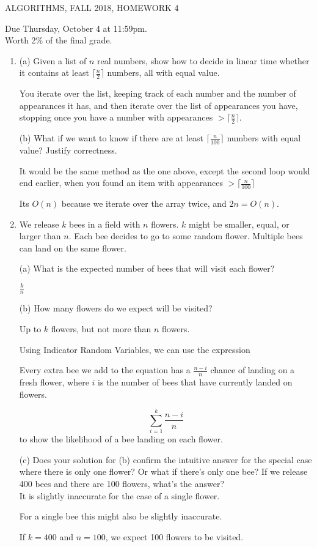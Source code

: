 \documentclass[12pt]{article}
\begin{document}
  
\pagestyle{empty}
 

\begin{center} ALGORITHMS,   FALL 2018, HOMEWORK 4
\end{center}
\noindent Due Thursday, October 4 at 11:59pm.  \\
Worth 2\% of the final grade.\\

\begin{enumerate}
 \item 
(a) Given a list  of $n$ real numbers, show how to decide in linear time whether it contains at least  $\lceil \frac{n}{2} \rceil$ numbers, all with equal value.  

You iterate over the list, keeping track of each number and the number of appearances it has, and then iterate over the list of appearances you have,
stopping once you have a number with appearances $> \lceil \frac{n}{2} \rceil$.

(b) What if we want to know if there are at least $\lceil \frac{n}{100} \rceil$ numbers with equal value? Justify correctness.

It would be the same method as the one above, except the second loop would end earlier, when you found an item with appearances $> \lceil \frac{n}{100} \rceil$

Its $O(n)$ because we iterate over the array twice, and $2n = O(n)$.

\pagebreak

\item
We release $k$ bees in a field with $n$ flowers.  $k$ might be smaller, equal, or larger than $n$.
Each bee decides to go to some random flower.  Multiple bees can land on the same flower.

(a) What is the expected number of bees that will visit each flower?

$\frac{k}{n}$

(b) How many flowers do we expect will be visited?

Up to $k$ flowers, but not more than $n$ flowers.

Using Indicator Random Variables, we can use the expression

Every extra bee we add to the equation has a $\frac{n - i}{n}$ chance of landing on a fresh flower,
where $i$ is the number of bees that have currently landed on flowers.

$$\sum_{i=1}^{k} \frac{n - i}{n}$$
to show the likelihood of a bee landing on each flower.


(c) Does your solution for (b) confirm the  intuitive answer for the special case where there is only one flower?  Or what if there's only one bee?   
 If we release 400 bees and there are 100 flowers, what's the answer?\\

It is slightly inaccurate for the case of a single flower.

For a single bee this might also be slightly inaccurate.

If $k=400$ and $n=100$, we expect 100 flowers to be visited.



\end{enumerate}
\end{document}
